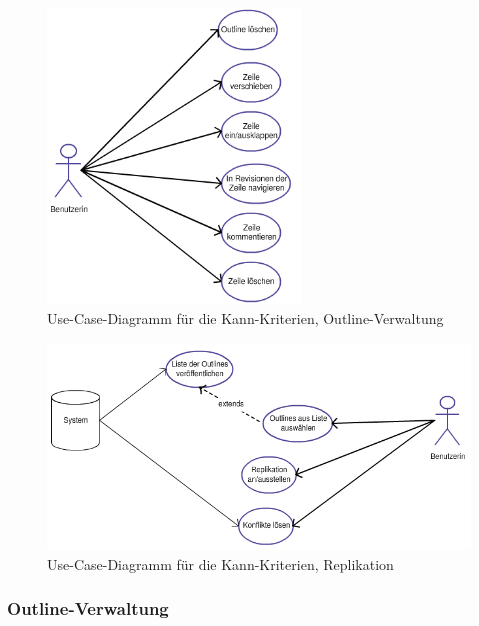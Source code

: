 \medskip
\begin{figure}[ht] 
  \begin{center}
  \includegraphics[width=0.6\textwidth]{grafik/usecasediagramm-kann-editor} 
  \end{center}
  \caption{Use-Case-Diagramm für die Kann-Kriterien, Outline-Verwaltung}
  \label{fig:usecasediagramm-kann-editor} 
\end{figure}

\medskip
\begin{figure}[ht] 
  \begin{center}
  \includegraphics[width=\textwidth]{grafik/usecasediagramm-kann-repl} 
  \end{center}
  \caption{Use-Case-Diagramm für die Kann-Kriterien, Replikation}
  \label{fig:usecasediagramm-kann-repl} 
\end{figure}


\subsubsection{Outline-Verwaltung}

